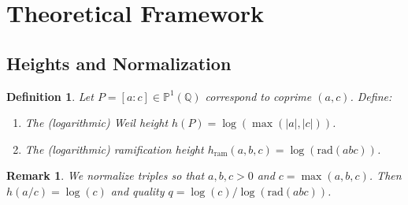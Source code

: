 \documentclass[11pt,a4paper]{article}
\newtheorem{definition}{Definition}[section]
\newtheorem{remark}{Remark}[section]
\newcommand{\Q}{\mathbb{Q}}
\newcommand{\Pp}{\mathbb{P}}
\newcommand{\rad}{\mathrm{rad}}
\begin{document}
\section{Theoretical Framework}
\subsection{Heights and Normalization}
\begin{definition}
Let $P=[a:c]\in\Pp^1(\Q)$ correspond to coprime $(a,c)$. Define:
\begin{enumerate}
    \item The (logarithmic) Weil height $h(P)=\log(\max(|a|,|c|))$.
    \item The (logarithmic) ramification height $h_{\mathrm{ram}}(a,b,c)=\log(\rad(abc))$.
\end{enumerate}
\end{definition}
\begin{remark}
We normalize triples so that $a,b,c>0$ and $c=\max(a,b,c)$. Then $h(a/c)=\log(c)$ and quality $q=\log(c)/\log(\rad(abc))$.
\end{remark}
\end{document}

